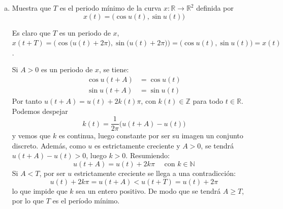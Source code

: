 \documentclass[12pt,spanish]{article}
\theoremstyle{definition}
\theoremstyle{remark}
\begin{document}
\begin{enumerate}[a)]
  \item Muestra que $T$ es el periodo mínimo de la curva
    $x:\mathbb{R}\rightarrow\mathbb{R}^2$ definida
    por \[x(t)=\big(\cos u(t), \sin u(t)\big)\]

    Es claro que $T$ es un periodo de $x$,
    $x(t+T)=\big(\cos\big(u(t)+2\pi\big),\sin\big(u(t)+2\pi\big)\big)=\big(\cos
    u(t),\sin u(t)\big)=x(t)$.

    Si $A>0$ es un periodo de $x$, se tiene:
    \begin{align*}
      \cos u(t+A)&=\cos u(t) \\
      \sin u(t+A)&=\sin u(t)
    \end{align*}
    Por tanto $u(t+A)=u(t)+2 k(t)\pi$, con $k(t)\in \mathbb{Z}$ para
    todo $t\in\mathbb{R}$. Podemos despejar
    \[k(t)=\frac{1}{2\pi}\big(u(t+A)-u(t)\big)\] y vemos que $k$ es
    continua, luego constante por ser su imagen un conjunto
    discreto. Además, como $u$ es estrictamente creciente y $A>0$, se
    tendrá $u(t+A)-u(t)>0$, luego $k>0$. Resumiendo:
    \[u(t+A)=u(t)+2k\pi\quad\text{ con } k\in\mathbb{N}\] Si $A<T$,
    por ser $u$ estrictamente creciente se llega a una contradicción:
    \[u(t)+2k\pi=u(t+A)<u(t+T)=u(t)+2\pi\] lo que impide que $k$ sea
    un entero positivo. De modo que se tendrá $A\geq T$, por lo que
    $T$ es el período mínimo.
  \end{enumerate}
  
  
\end{document}

